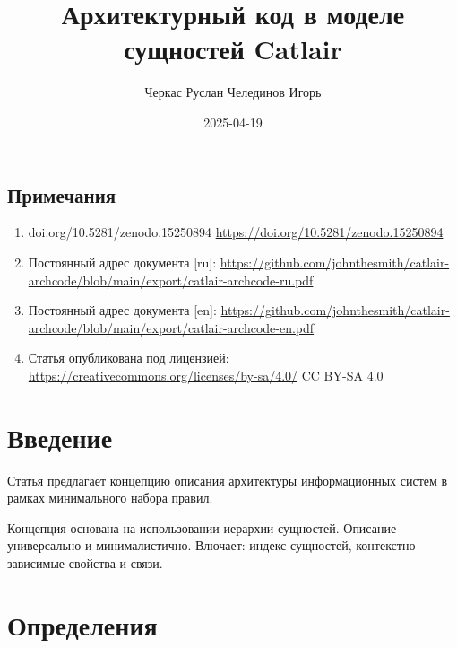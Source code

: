 \documentclass[final]{article}
\begin{document}
    \title{Архитектурный код в моделе сущностей Catlair}
    \author{
        Черкас Руслан
        Челединов Игорь
    }
    \date{2025-04-19}

    \begin{small}
        \begingroup
        \renewcommand{\baselinestretch}{0.8}

        \renewcommand{\contentsname}{Содержание}
        \maketitle
        \tableofcontents

        \section*{Примечания}
            \begin{enumerate}
                \item doi.org/10.5281/zenodo.15250894
                \url{https://doi.org/10.5281/zenodo.15250894}

                \item Постоянный адрес документа [ru]: 
                \url{https://github.com/johnthesmith/catlair-archcode/blob/main/export/catlair-archcode-ru.pdf}

                \item Постоянный адрес документа [en]: 
                \url{https://github.com/johnthesmith/catlair-archcode/blob/main/export/catlair-archcode-en.pdf}

                \item Статья опубликована под лицензией: 
                \url{https://creativecommons.org/licenses/by-sa/4.0/} CC BY-SA 4.0
            \end{enumerate}
        \endgroup
    \end{small}

    \section{Введение}

        Статья предлагает концепцию описания архитектуры информационных систем в 
        рамках минимального набора правил.

        Концепция основана на использовании иерархии сущностей. Описание 
        универсально и минималистично. Влючает: индекс сущностей, 
        контекстно-зависимые свойства и связи.

    \section{Определения} 
\end{document}

